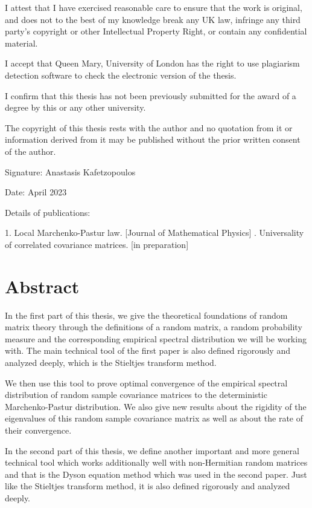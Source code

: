 \documentclass[11pt, a4paper, oneside]{book}
\numberwithin{equation}{chapter}
\begin{document}
I attest that I have exercised reasonable care to ensure that the work is original, and does not to the best of my knowledge break any UK law, infringe any third party’s copyright or other Intellectual Property Right, or contain any confidential material.
\medskip

I accept that Queen Mary, University of London has the right to use plagiarism detection software to check the electronic version of the thesis.
\medskip

I confirm that this thesis has not been previously submitted for the award of a degree by this or any other university.
\medskip

The copyright of this thesis rests with the author and no quotation from it or information derived from it may be published without the prior written consent of the author.
\medskip

Signature: Anastasis Kafetzopoulos

Date: April 2023
\medskip

Details of publications: 

1. Local Marchenko-Pastur law. [Journal of Mathematical Physics] . Universality of correlated covariance matrices. [in preparation]
\chapter*{Abstract}
\label{C:Abstract}


In the first part of this thesis, we give the theoretical foundations of random matrix theory through the definitions of a random matrix, a random probability measure and the corresponding empirical spectral distribution we will be working with. The main technical tool of the first paper is also defined rigorously and analyzed deeply, which is the Stieltjes transform method.

We then use this tool to prove optimal convergence of the empirical spectral distribution of random sample covariance matrices to the deterministic Marchenko-Pastur distribution. We also give new results about the rigidity of the eigenvalues of this random sample covariance matrix as well as about the rate of their convergence.

In the second part of this thesis, we define another important and more general technical tool which works additionally well with non-Hermitian random matrices and that is the Dyson equation method which was used in the second paper. Just like the Stieltjes transform method, it is also defined rigorously and analyzed deeply.
\end{document}
